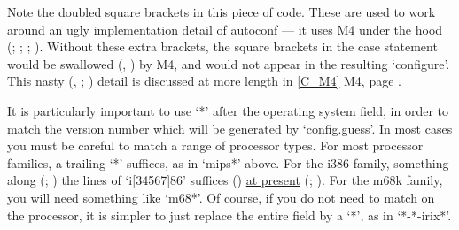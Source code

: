 Note the doubled square brackets in this piece of code.
These are used to work around an ugly implementation detail of autoconf --- it
uses M4 under the hood ({\MaQ{}}; {\MiQ{}}; {\McQ{}}; {\McQ{}}). Without these extra 
brackets, the square brackets in the case statement would be
swallowed ({\MdQ{}}, {\MpQ{}}) by M4, and would not appear in the 
resulting `configure'. This nasty ({\McQ{}}, {\MaQ{}}; {\McQ{}}) detail is 
discussed at more length in \ref{C_M4} M4, page \pageref{C_M4}.

It is particularly important to use `*' after the operating system field, in 
order to match the version number which will be generated by `config.guess'.
In most cases you must be careful to match a range of processor types. For 
most processor families, a trailing `*' suffices, as in `mips*' above. For 
the i386 family, something along ({\MgQ{}}; {\MjQ{}}) the lines of `i[34567]86' 
suffices ({\McQ{}}) \underline{at present} ({\MbQ{}}; {\MbQ{}}). For the m68k family,
you will need something like `m68*'. Of course, if you do not need to 
match on the processor, it is simpler to just replace the entire field 
by a `*', as in `*-*-irix*'. 

